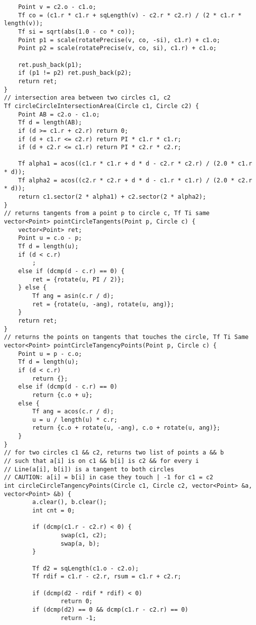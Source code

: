 \documentclass[FSZ,a4paper,onesided]{article}
\begin{document}
\begin{multicols*}{\COLS}
\begin{lstlisting}
    Point v = c2.o - c1.o;
    Tf co = (c1.r * c1.r + sqLength(v) - c2.r * c2.r) / (2 * c1.r * length(v));
    Tf si = sqrt(abs(1.0 - co * co));
    Point p1 = scale(rotatePrecise(v, co, -si), c1.r) + c1.o;
    Point p2 = scale(rotatePrecise(v, co, si), c1.r) + c1.o;

    ret.push_back(p1);
    if (p1 != p2) ret.push_back(p2);
    return ret;
}
// intersection area between two circles c1, c2
Tf circleCircleIntersectionArea(Circle c1, Circle c2) {
    Point AB = c2.o - c1.o;
    Tf d = length(AB);
    if (d >= c1.r + c2.r) return 0;
    if (d + c1.r <= c2.r) return PI * c1.r * c1.r;
    if (d + c2.r <= c1.r) return PI * c2.r * c2.r;

    Tf alpha1 = acos((c1.r * c1.r + d * d - c2.r * c2.r) / (2.0 * c1.r * d));
    Tf alpha2 = acos((c2.r * c2.r + d * d - c1.r * c1.r) / (2.0 * c2.r * d));
    return c1.sector(2 * alpha1) + c2.sector(2 * alpha2);
}
// returns tangents from a point p to circle c, Tf Ti same
vector<Point> pointCircleTangents(Point p, Circle c) {
    vector<Point> ret;
    Point u = c.o - p;
    Tf d = length(u);
    if (d < c.r)
        ;
    else if (dcmp(d - c.r) == 0) {
        ret = {rotate(u, PI / 2)};
    } else {
        Tf ang = asin(c.r / d);
        ret = {rotate(u, -ang), rotate(u, ang)};
    }
    return ret;
}
// returns the points on tangents that touches the circle, Tf Ti Same
vector<Point> pointCircleTangencyPoints(Point p, Circle c) {
    Point u = p - c.o;
    Tf d = length(u);
    if (d < c.r)
        return {};
    else if (dcmp(d - c.r) == 0)
        return {c.o + u};
    else {
        Tf ang = acos(c.r / d);
        u = u / length(u) * c.r;
        return {c.o + rotate(u, -ang), c.o + rotate(u, ang)};
    }
}
// for two circles c1 && c2, returns two list of points a && b
// such that a[i] is on c1 && b[i] is c2 && for every i
// Line(a[i], b[i]) is a tangent to both circles
// CAUTION: a[i] = b[i] in case they touch | -1 for c1 = c2
int circleCircleTangencyPoints(Circle c1, Circle c2, vector<Point> &a, vector<Point> &b) {
        a.clear(), b.clear();
        int cnt = 0;
        
        if (dcmp(c1.r - c2.r) < 0) {
                swap(c1, c2);
                swap(a, b);
        }
        
        Tf d2 = sqLength(c1.o - c2.o);
        Tf rdif = c1.r - c2.r, rsum = c1.r + c2.r;
        
        if (dcmp(d2 - rdif * rdif) < 0) 
                return 0;
        if (dcmp(d2) == 0 && dcmp(c1.r - c2.r) == 0) 
                return -1;


\end{lstlisting}
\end{multicols*}
\end{document}
